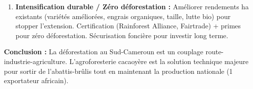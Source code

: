 \documentclass[11pt]{article}
\begin{document}
\begin{exoresolu}
\begin{enumerate}
\begin{enumerate}
                  \item \textbf{Intensification durable / Zéro déforestation :} Améliorer rendements ha existants (variétés améliorées, engrais organiques, taille, lutte bio) pour stopper l'extension. Certification (Rainforest Alliance, Fairtrade) + primes pour zéro déforestation. Sécurisation foncière pour investir long terme.
              \end{enumerate}
    \end{enumerate}
    \textbf{Conclusion :} La déforestation au Sud-Cameroun est un couplage route-industrie-agriculture. L'agroforesterie cacaoyère est la solution technique majeure pour sortir de l'abattis-brûlis tout en maintenant la production nationale (1 exportateur africain).
\end{exoresolu}
\end{document}
